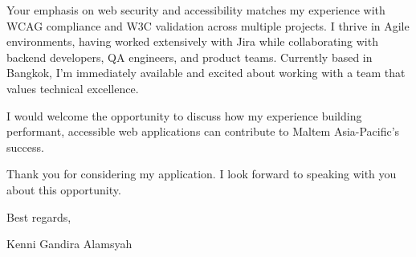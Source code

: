 \documentclass[12pt]{article}
\begin{document}
Your emphasis on web security and accessibility matches my experience with WCAG compliance and W3C validation across multiple projects. I thrive in Agile environments, having worked extensively with Jira while collaborating with backend developers, QA engineers, and product teams. Currently based in Bangkok, I'm immediately available and excited about working with a team that values technical excellence.

\vspace{0.3cm}

I would welcome the opportunity to discuss how my experience building performant, accessible web applications can contribute to Maltem Asia-Pacific's success.

\vspace{0.3cm}

Thank you for considering my application. I look forward to speaking with you about this opportunity.

\vspace{0.5cm}

Best regards,

\vspace{0.2cm}

Kenni Gandira Alamsyah
\end{document}
